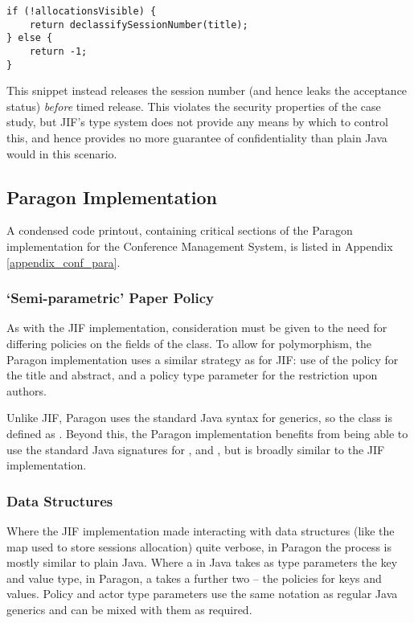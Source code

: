 \begin{verbatim}
if (!allocationsVisible) {
	return declassifySessionNumber(title);
} else {
	return -1;
}
\end{verbatim}

This snippet instead releases the session number (and hence leaks the acceptance status) \textit{before} timed release. This violates the security properties of the case study, but JIF's type system does not provide any means by which to control this, and hence provides no more guarantee of confidentiality than plain Java would in this scenario.

\subsection{Paragon Implementation}

A condensed code printout, containing critical sections of the Paragon implementation for the Conference Management System, is listed in Appendix \ref{appendix_conf_para}.

\subsubsection{`Semi-parametric' Paper Policy}

As with the JIF implementation, consideration must be given to the need for differing policies on the fields of the  class. To allow for polymorphism, the Paragon implementation uses a similar strategy as for JIF: use of the  policy for the title and abstract, and a policy type parameter for the restriction upon authors.

Unlike JIF, Paragon uses the standard Java syntax for generics, so the class is defined as . Beyond this, the Paragon implementation benefits from being able to use the standard Java signatures for ,  and , but is broadly similar to the JIF implementation.

\subsubsection{Data Structures}

Where the JIF implementation made interacting with data structures (like the map used to store sessions allocation) quite verbose, in Paragon the process is mostly similar to plain Java. Where a  in Java takes as type parameters the key and value type, in Paragon, a  takes a further two -- the policies for keys and values. Policy and actor type parameters use the same notation as regular Java generics and can be mixed with them as required.

